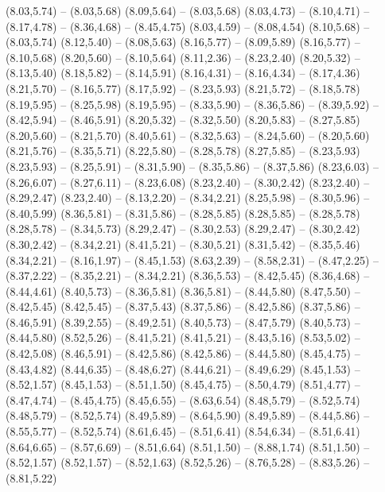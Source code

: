 {  (8.03,5.74) -- (8.03,5.68)
  (8.09,5.64) -- (8.03,5.68)
  (8.03,4.73) -- (8.10,4.71) -- (8.17,4.78) -- (8.36,4.68) -- (8.45,4.75)
  (8.03,4.59) -- (8.08,4.54)
  (8.10,5.68) -- (8.03,5.74)
  (8.12,5.40) -- (8.08,5.63)
  (8.16,5.77) -- (8.09,5.89)
  (8.16,5.77) -- (8.10,5.68)
  (8.20,5.60) -- (8.10,5.64)
  (8.11,2.36) -- (8.23,2.40)
  (8.20,5.32) -- (8.13,5.40)
  (8.18,5.82) -- (8.14,5.91)
  (8.16,4.31) -- (8.16,4.34) -- (8.17,4.36)
  (8.21,5.70) -- (8.16,5.77)
  (8.17,5.92) -- (8.23,5.93)
  (8.21,5.72) -- (8.18,5.78)
  (8.19,5.95) -- (8.25,5.98)
  (8.19,5.95) -- (8.33,5.90) -- (8.36,5.86) -- (8.39,5.92) -- (8.42,5.94) -- (8.46,5.91)
  (8.20,5.32) -- (8.32,5.50)
  (8.20,5.83) -- (8.27,5.85)
  (8.20,5.60) -- (8.21,5.70)
  (8.40,5.61) -- (8.32,5.63) -- (8.24,5.60) -- (8.20,5.60)
  (8.21,5.76) -- (8.35,5.71)
  (8.22,5.80) -- (8.28,5.78)
  (8.27,5.85) -- (8.23,5.93)
  (8.23,5.93) -- (8.25,5.91) -- (8.31,5.90) -- (8.35,5.86) -- (8.37,5.86)
  (8.23,6.03) -- (8.26,6.07) -- (8.27,6.11) -- (8.23,6.08)
  (8.23,2.40) -- (8.30,2.42)
  (8.23,2.40) -- (8.29,2.47)
  (8.23,2.40) -- (8.13,2.20) -- (8.34,2.21)
  (8.25,5.98) -- (8.30,5.96) -- (8.40,5.99)
  (8.36,5.81) -- (8.31,5.86) -- (8.28,5.85)
  (8.28,5.85) -- (8.28,5.78)
  (8.28,5.78) -- (8.34,5.73)
  (8.29,2.47) -- (8.30,2.53)
  (8.29,2.47) -- (8.30,2.42)
  (8.30,2.42) -- (8.34,2.21)
  (8.41,5.21) -- (8.30,5.21)
  (8.31,5.42) -- (8.35,5.46)
  (8.34,2.21) -- (8.16,1.97) -- (8.45,1.53)
  (8.63,2.39) -- (8.58,2.31) -- (8.47,2.25) -- (8.37,2.22) -- (8.35,2.21) -- (8.34,2.21)
  (8.36,5.53) -- (8.42,5.45)
  (8.36,4.68) -- (8.44,4.61)
  (8.40,5.73) -- (8.36,5.81)
  (8.36,5.81) -- (8.44,5.80)
  (8.47,5.50) -- (8.42,5.45)
  (8.42,5.45) -- (8.37,5.43)
  (8.37,5.86) -- (8.42,5.86)
  (8.37,5.86) -- (8.46,5.91)
  (8.39,2.55) -- (8.49,2.51)
  (8.40,5.73) -- (8.47,5.79)
  (8.40,5.73) -- (8.44,5.80)
  (8.52,5.26) -- (8.41,5.21)
  (8.41,5.21) -- (8.43,5.16)
  (8.53,5.02) -- (8.42,5.08)
  (8.46,5.91) -- (8.42,5.86)
  (8.42,5.86) -- (8.44,5.80)
  (8.45,4.75) -- (8.43,4.82)
  (8.44,6.35) -- (8.48,6.27)
  (8.44,6.21) -- (8.49,6.29)
  (8.45,1.53) -- (8.52,1.57)
  (8.45,1.53) -- (8.51,1.50)
  (8.45,4.75) -- (8.50,4.79)
  (8.51,4.77) -- (8.47,4.74) -- (8.45,4.75)
  (8.45,6.55) -- (8.63,6.54)
  (8.48,5.79) -- (8.52,5.74)
  (8.48,5.79) -- (8.52,5.74)
  (8.49,5.89) -- (8.64,5.90)
  (8.49,5.89) -- (8.44,5.86) -- (8.55,5.77) -- (8.52,5.74)
  (8.61,6.45) -- (8.51,6.41)
  (8.54,6.34) -- (8.51,6.41)
  (8.64,6.65) -- (8.57,6.69) -- (8.51,6.64)
  (8.51,1.50) -- (8.88,1.74)
  (8.51,1.50) -- (8.52,1.57)
  (8.52,1.57) -- (8.52,1.63)
  (8.52,5.26) -- (8.76,5.28) -- (8.83,5.26) -- (8.81,5.22)
}
